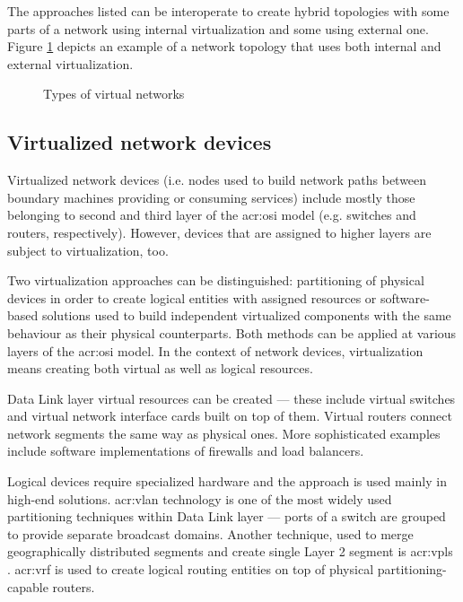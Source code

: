 \documentclass[11pt]{book}
\begin{document}
        The approaches listed can be interoperate to create hybrid topologies with some parts of a network using
        internal virtualization and some using external one. Figure \ref{fig:ctx:nvtypes} depicts an example of a
        network topology that uses both internal and external virtualization.
        

        \begin{figure}[H]
          \caption{Types of virtual networks}
          \label{fig:ctx:nvtypes}
        \end{figure}


      \subsection{Virtualized network devices}

        Virtualized network devices (i.e. nodes used to build network paths between boundary machines providing or
        consuming services) include mostly those belonging to second and third layer of the \gls{acr:osi} model (e.g.
        switches and routers, respectively). However, devices that are assigned to higher layers are subject to
        virtualization, too.

        Two virtualization approaches can be distinguished: partitioning of physical devices in order to create logical
        entities with assigned resources or software-based solutions used to build independent virtualized components
        with the same behaviour as their physical counterparts. Both methods can be applied at various layers of the
        \gls{acr:osi} model. In the context of network devices, virtualization means creating both virtual as well as
        logical resources.

        Data Link layer virtual resources can be created --- these include virtual switches and virtual network
        interface cards built on top of them. Virtual routers connect network segments the same way as physical ones.
        More sophisticated examples include software implementations of firewalls and load balancers.

        Logical devices require specialized hardware and the approach is used mainly in high-end solutions.
        \gls{acr:vlan} technology is one of the most widely used partitioning techniques within Data Link layer ---
        ports of a switch are grouped to provide separate broadcast domains. Another technique, used to merge
        geographically distributed segments and create single Layer 2 segment is \gls{acr:vpls} \cite{moreno}.
        \gls{acr:vrf} is used to create logical routing entities on top of physical partitioning-capable routers.
\end{document}
